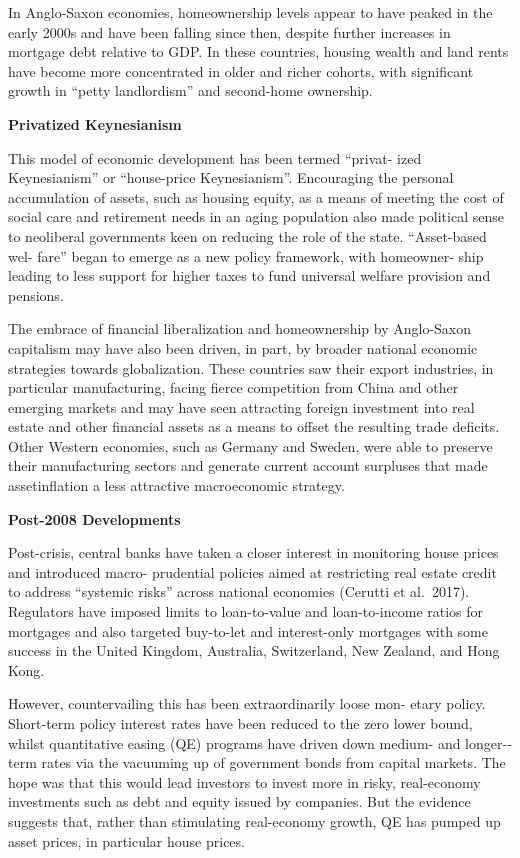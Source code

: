 \documentclass[
]{book}
\begin{document}
In Anglo-­Saxon economies, homeownership levels appear
to have peaked in the early 2000s and have been
falling since then, despite further increases in mortgage debt relative
to GDP.
In these countries,
housing wealth and land rents have become more concentrated in
older and richer cohorts, with significant growth in ``petty landlordism''
and second-­home ownership.

\textbf{Privatized Keynesianism}

This model of economic development has been termed ``privat-
ized Keynesianism'' or ``house-price Keynesianism''.
Encouraging the personal accumulation of assets, such as housing
equity, as a means of meeting the cost of social care and retirement
needs in an aging population also made political sense to neoliberal
governments keen on reducing the role of the state. ``Asset-­based wel-
fare'' began to emerge as a new policy framework, with homeowner-
ship leading to less support for higher taxes to fund universal welfare
provision and pensions.

The embrace of financial liberalization and homeownership by
Anglo-­Saxon capitalism may have also been driven, in part, by broader
national economic strategies towards globalization. These countries
saw their export industries, in particular manufacturing, facing fierce
competition from China and other emerging markets and may have
seen attracting foreign investment into real estate and other financial
assets as a means to offset the resulting trade deficits. Other Western
economies, such as Germany and Sweden, were able to preserve their
manufacturing sectors and generate current account surpluses that
made assetinflation a less attractive macroeconomic strategy.

\textbf{Post-­2008 Developments}

Post-­crisis, central banks have taken a closer interest in monitoring
house prices and introduced macro-­
prudential policies aimed at
restricting real estate credit to address ``systemic risks'' across national
economies (Cerutti et al.~2017). Regulators have imposed limits to
loan-­to-­value and loan-­to-­income ratios for mortgages and also targeted
buy-­to-­let and interest-­only mortgages with some success in
the United Kingdom, Australia, Switzerland, New Zealand, and Hong
Kong.

However, countervailing this has been extraordinarily loose mon-
etary policy. Short-­term policy interest rates have been reduced to
the zero lower bound, whilst quantitative easing (QE) programs have
driven down medium-­ and longer-­term rates via the vacuuming up of
government bonds from capital markets. The hope was that this would
lead investors to invest more in risky, real-­economy investments such
as debt and equity issued by companies. But the evidence suggests
that, rather than stimulating real-­economy growth, QE has pumped
up asset prices, in particular house prices.
\end{document}
